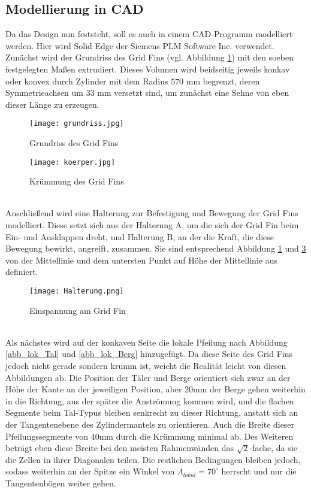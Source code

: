 \subsection{Modellierung in CAD}
Da das Design nun feststeht, soll es auch in einem CAD-Programm modelliert werden. Hier wird Solid Edge der Siemens PLM Software Inc. verwendet. Zunächst wird der Grundriss des Grid Fins (vgl. Abbildung \ref{abb_grundriss}) mit den soeben festgelegten Maßen extrudiert. Dieses Volumen wird beidseitig jeweils konkav oder konvex durch Zylinder mit dem Radius $570$ mm begrenzt, deren Symmetrieachsen um $33$ mm versetzt sind, um zunächst eine Sehne von eben dieser Länge zu erzeugen.
\begin{figure}[h]
	\centering
	\texttt{[image: grundriss.jpg]}
	\caption{Grundriss des Grid Fins}
	\label{abb_grundriss}
\end{figure}
\begin{figure}[h]
\centering
\texttt{[image: koerper.jpg]}
\caption{Krümmung des Grid Fins}
\label{abb_körper}
\end{figure}\\
Anschließend wird eine Halterung zur Befestigung und Bewegung der Grid Fins modelliert. Diese setzt sich aus der Halterung A, um die sich der Grid Fin beim Ein- und Ausklappen dreht, und Halterung B, an der die Kraft, die diese Bewegung bewirkt, angreift, zusammen. Sie sind entsprechend Abbildung \ref{abb_grundriss} und \ref{abb_halterung} von der Mittellinie und dem untersten Punkt auf Höhe der Mittellinie aus definiert.
\begin{figure}[h]
	\centering
	\texttt{[image: Halterung.png]}
	\caption{Einspannung am Grid Fin}
	\label{abb_halterung}
\end{figure}\\
Als nächstes wird auf der konkaven Seite die lokale Pfeilung nach Abbildung \ref{abb_lok_Tal} und \ref{abb_lok_Berg} hinzugefügt. Da diese Seite des Grid Fins jedoch nicht gerade sondern krumm ist, weicht die Realität leicht von diesen Abbildungen ab. Die Position der Täler und Berge orientiert sich zwar an der Höhe der Kante an der jeweiligen Position, aber $20$mm der Berge gehen weiterhin in die Richtung, aus der später die Anströmung kommen wird, und die flachen Segmente beim Tal-Typus bleiben senkrecht zu dieser Richtung, anstatt sich an der Tangentenebene des Zylindermantels zu orientieren. Auch die Breite dieser Pfeilungssegmente von $40$mm durch die Krümmung minimal ab. Des Weiteren beträgt eben diese Breite bei den meisten Rahmenwänden das $\sqrt{2}$-fache, da sie die Zellen in ihrer Diagonalen teilen. Die restlichen Bedingungen bleiben jedoch, sodass weiterhin an der Spitze ein Winkel von $\Lambda_{lokal} = 70^\circ$ herrscht und nur die Tangentenbögen weiter gehen.

